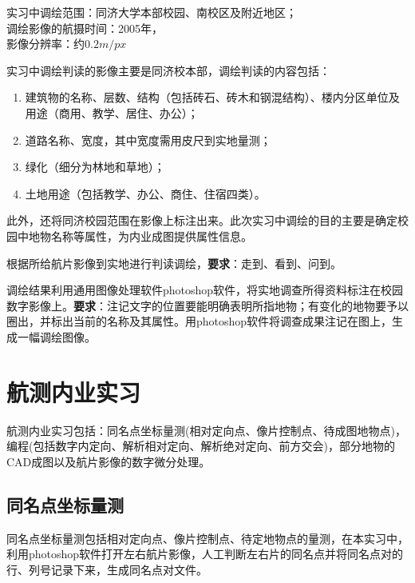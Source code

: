 \noindent 实习中调绘范围：同济大学本部校园、南校区及附近地区；\\
调绘影像的航摄时间：2005年，\\
影像分辨率：约$0.2\si{m/px}$

实习中调绘判读的影像主要是同济校本部，调绘判读的内容包括：
\begin{enumerate}
\item 建筑物的名称、层数、结构（包括砖石、砖木和钢混结构）、楼内分区单位及用途（商用、教学、居住、办公）；
\item 道路名称、宽度，其中宽度需用皮尺到实地量测；
\item 绿化（细分为林地和草地）；
\item 土地用途（包括教学、办公、商住、住宿四类）。
\end{enumerate}

此外，还将同济校园范围在影像上标注出来。此次实习中调绘的目的主要是确定校园中地物名称等属性，为内业成图提供属性信息。

根据所给航片影像到实地进行判读调绘，\textbf{要求}：走到、看到、问到。

调绘结果利用通用图像处理软件photoshop软件，将实地调查所得资料标注在校园数字影像上。\textbf{要求}：注记文字的位置要能明确表明所指地物；有变化的地物要予以圈出，并标出当前的名称及其属性。用photoshop软件将调查成果注记在图上，生成一幅调绘图像。


\section{航测内业实习}
\label{sec:neiye}
航测内业实习包括：同名点坐标量测(相对定向点、像片控制点、待成图地物点)，编程(包括数字内定向、解析相对定向、解析绝对定向、前方交会)，部分地物的CAD成图以及航片影像的数字微分处理。

\subsection{同名点坐标量测}
\label{sub:tongming}

同名点坐标量测包括相对定向点、像片控制点、待定地物点的量测，在本实习中，利用photoshop软件打开左右航片影像，人工判断左右片的同名点并将同名点对的行、列号记录下来，生成同名点对文件。



